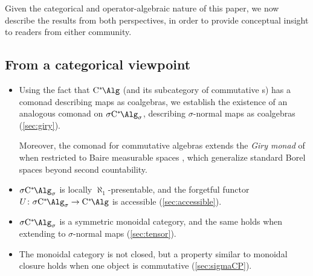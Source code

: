 Given the categorical and operator-algebraic nature of this paper, we now describe the results from both perspectives, in order to provide conceptual insight to readers from either community.

\subsection*{From a categorical viewpoint}
\begin{itemize}
	\item Using the fact that $\Calg$ (and its subcategory of commutative \cstar{}s) has a comonad describing \cpu{} maps as coalgebras, we establish the existence of an analogous comonad on $\SigmaC$, describing $\sigma$-normal \cpu{} maps as coalgebras (\cref{sec:giry}).

	      Moreover, the comonad for commutative algebras extends the \emph{Giry monad} of \cite{giry82probability} when restricted to Baire measurable spaces \cite[\S4.2]{fritz2025categories}, which generalize standard Borel spaces beyond second countability.
	\item $\SigmaC$ is locally $\aleph_1$-presentable, and the forgetful functor $U\colon \SigmaC \to \Calg$ is accessible (\cref{sec:accessible}).
	\item $\SigmaC$ is a symmetric monoidal category, and the same holds when extending to $\sigma$-normal \cpu{} maps (\cref{sec:tensor}).
	\item The monoidal category is not closed, but a property similar to monoidal closure holds when one object is commutative (\cref{sec:sigmaCP}).
\end{itemize}
